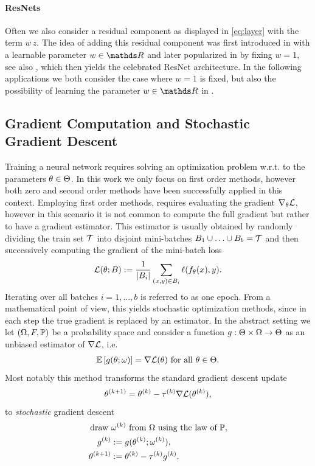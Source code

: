 \paragraph{ResNets} Often we also consider a residual component as displayed in \cref{eq:layer} with the term $w\, z$. The idea of adding this residual component was first introduced in \cite{srivastava2015highway} with a learnable parameter $w\in\R$ and later popularized in \cite{he2016deep} by fixing $w=1$, see also \cite{he2016identity}, which then yields the celebrated ResNet architecture. In the following applications we both consider the case where $w=1$ is fixed, but also the possibility of learning the parameter $w\in\R$ in \cite{bungert2021neural}.
%
\subsection{Gradient Computation and Stochastic Gradient Descent}\label{sec:SGD}
%
%
Training a neural network requires solving an optimization problem w.r.t. to the parameters $\param\in\Param$. In this work we only focus on first order methods, however both zero \cite{riedl2022leveraging, pinnau2017consensus, carrillo2021consensus} and second order methods \cite{martens2010deep} have been successfully applied in this context. Employing first order methods, requires evaluating the gradient $\nabla_\theta \empLoss$, however in this scenario it is not common to compute the full gradient but rather to have a gradient estimator. This estimator is usually obtained by randomly dividing the train set $\trSet$ into disjoint mini-batches $B_1\cup\ldots\cup B_b = \trSet$ and then successively computing the gradient of the mini-batch loss
%
\begin{align*}
\empLoss(\param;B):=\frac{1}{\abs{B_i}}\sum_{(x,y)\in B_i} \ell(f_\param(x), y).
\end{align*}
%
%
Iterating over all batches $i=1,\ldots,b$ is referred to as one epoch. From a mathematical point of view, this yields stochastic optimization methods, since in each step the true gradient is replaced by an estimator. In the abstract setting we let $(\Omega,F,\P)$ be a probability space and consider a function $g:\Param\times \Omega\to \Param$ as an unbiased estimator of $\nabla\empLoss$, i.e.
%
\begin{align*}
\Exp{g(\param;\omega)} = \nabla\empLoss(\param)\text{ for all } \param\in\Param.
\end{align*}
%
Most notably this method transforms the standard gradient descent update \cite{cauchy1847methode}
%
\begin{align*}
\param^{(k+1)} = \param^{(k)} - \tau^{(k)} \nabla \empLoss(\theta^{(k)}),
\end{align*}
%
to \emph{stochastic} gradient descent \cite{robbins1951stochastic}
%
\begin{align*}
\text{draw }&\omega^{(k)}\text{ from }\Omega\text{ using the law of }\P,\\
g^{(k)} &:= {g(\param^{(k)};\omega^{(k)})},\\
\param^{(k+1)} &:= \param^{(k)} - \tau^{(k)} g^{(k)}.
\end{align*}
%
%
%
%
%
\clearpage%
